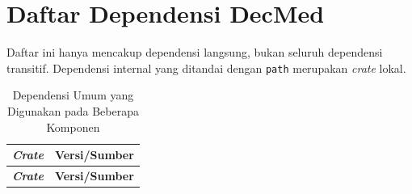 \chapter{Daftar Dependensi DecMed}
\label{lampiran:daftar-dependensi-perangkat-lunak}

Daftar ini hanya mencakup dependensi langsung, bukan seluruh dependensi transitif. Dependensi internal yang ditandai dengan \texttt{path} merupakan \textit{crate} lokal.

\begin{longtable}{|>{\raggedright\arraybackslash}p{}|>{\raggedright\arraybackslash}p{}|}
	\caption{Dependensi Umum yang Digunakan pada Beberapa Komponen}
	\label{tab:dependensi-umum}                                       \\
	\hline
	\textbf{\textit{Crate}}               & \textbf{Versi/Sumber}     \\
	\hline
	\endfirsthead
	\hline
	\textbf{\textit{Crate}}               & \textbf{Versi/Sumber}     \\
	\hline
	\endhead


\end{longtable}
